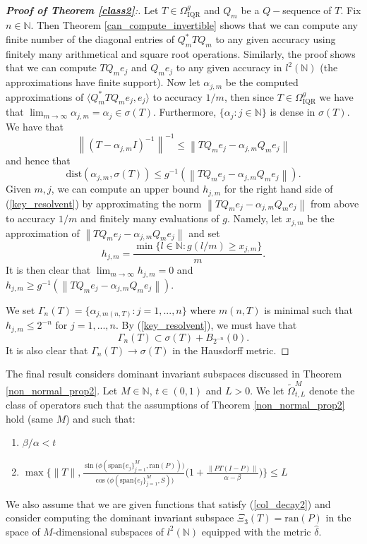 \documentclass[a4paper,10pt]{article}
\begin{document}
\begin{proof}[\textbf{Proof of Theorem \ref{class2}}:]
Let $T\in\Omega_{\mathrm{IQR}}^g$ and $Q_m$ be a $Q-$sequence of $T$. Fix $n\in\mathbb{N}$. Then Theorem \ref{can_compute_invertible} shows that we can compute any finite number of the diagonal entries of $Q_m^*TQ_m$ to any given accuracy using finitely many arithmetical and square root operations. Similarly, the proof shows that we can compute $TQ_me_j$ and $Q_me_j$ to any given accuracy in $l^2(\mathbb{N})$ (the approximations have finite support). Now let $\alpha_{j,m}$ be the computed approximations of $\langle Q_m^*TQ_me_j,e_j\rangle$ to accuracy $1/m$, then since $T\in\Omega_{\mathrm{IQR}}^g$ we have that $\lim_{m\rightarrow\infty}\alpha_{j,m}=\alpha_j\in\sigma(T)$. Furthermore, $\{\alpha_j:{j\in\mathbb{N}}\}$ is dense in $\sigma(T)$. We have that
$$
\left\|(T-\alpha_{j,m}I)^{-1}\right\|^{-1}\leq\left\|TQ_me_j-\alpha_{j,m}Q_me_j\right\|
$$
and hence that
\begin{equation}
\label{key_resolvent}
\mathrm{dist}(\alpha_{j,m},\sigma(T))\leq g^{-1}(\left\|TQ_me_j-\alpha_{j,m}Q_me_j\right\|).
\end{equation}
Given $m,j$, we can compute an upper bound $h_{j,m}$ for the right hand side of (\ref{key_resolvent}) by approximating the norm $\left\|TQ_me_j-\alpha_{j,m}Q_me_j\right\|$ from above to accuracy $1/m$ and finitely many evaluations of $g$. Namely, let $x_{j,m}$ be the approximation of $\left\|TQ_me_j-\alpha_{j,m}Q_me_j\right\|$ and set
$$
h_{j,m}=\frac{\min\{l\in\mathbb{N}:g(l/m)\geq x_{j,m}\}}{m}.
$$
It is then clear that $\lim_{m\rightarrow \infty}h_{j,m}=0$ and $h_{j,m}\geq g^{-1}(\left\|TQ_me_j-\alpha_{j,m}Q_me_j\right\|)$.

We set $\Gamma_{n}(T)=\{\alpha_{j,m(n,T)}:j=1,...,n\}$ where $m(n,T)$ is minimal such that $h_{j,m}\leq 2^{-n}$ for $j=1,...,n$. By (\ref{key_resolvent}), we must have that
$$
\Gamma_{n}(T)\subset\sigma(T)+B_{2^{-n}}(0).
$$
It is also clear that $\Gamma_n(T)\rightarrow\sigma(T)$ in the Hausdorff metric.
\end{proof}

The final result considers dominant invariant subspaces discussed in Theorem \ref{non_normal_prop2}. Let $M\in\mathbb{N}$, $t\in(0,1)$ and $L>0$. We let $\tilde\Omega^M_{t,L}$ denote the class of operators such that the assumptions of Theorem \ref{non_normal_prop2} hold (same $M$) and such that:
\begin{enumerate}
	\item $\beta/\alpha<t$
	\item $\max\Big\{\|T\|,\frac{\sin\big(\phi(\mathrm{span}\{e_j\}_{j=1}^M,\mathrm{ran}(P))\big)}{\cos\big(\phi(\mathrm{span}\{e_j\}_{j=1}^M,S)\big)}\Big(1+\frac{\|PT(I-P)\|}{\alpha-\beta}\Big)\Big\}\leq L$
\end{enumerate}
We also assume that we are given functions that satisfy (\ref{col_decay2}) and consider computing the dominant invariant subspace $\Xi_3(T)=\mathrm{ran}(P)$ in the space of $M$-dimensional subspaces of $l^2(\mathbb{N})$ equipped with the metric $\hat\delta$. %
\end{document}
